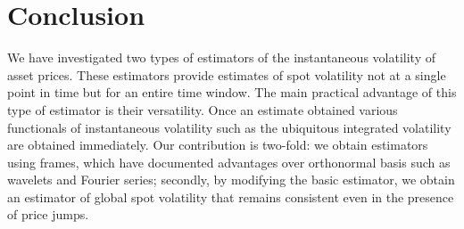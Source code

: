 \section{Conclusion}
We have investigated two types of estimators of the instantaneous volatility of asset prices. These estimators provide estimates of spot volatility not at a single point in time but for an  entire time window. The main practical advantage of this type of estimator is their versatility. Once an estimate obtained various functionals of instantaneous volatility such as the ubiquitous integrated volatility are obtained immediately. Our contribution is two-fold: we obtain estimators using frames, which have documented advantages over orthonormal basis such as wavelets and Fourier series; secondly, by modifying  the basic estimator, we obtain an estimator of global spot volatility  that remains consistent even in the presence of price jumps.   
